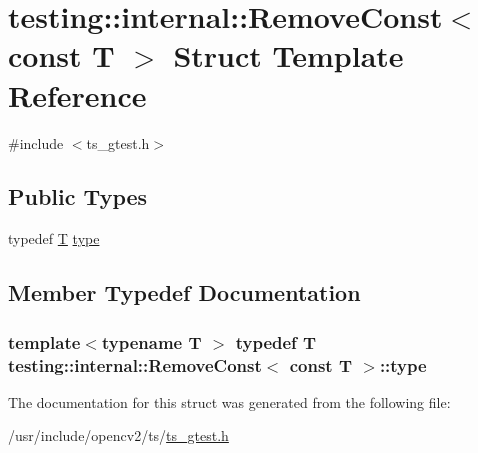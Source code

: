 \hypertarget{structtesting_1_1internal_1_1RemoveConst_3_01const_01T_01_4}{\section{testing\-:\-:internal\-:\-:Remove\-Const$<$ const T $>$ Struct Template Reference}
\label{structtesting_1_1internal_1_1RemoveConst_3_01const_01T_01_4}
}


{\ttfamily \#include $<$ts\-\_\-gtest.\-h$>$}

\subsection*{Public Types}
\begin{DoxyCompactItemize}
\item 
typedef \hyperlink{calib3d_8hpp_a3efb9551a871ddd0463079a808916717}{T} \hyperlink{structtesting_1_1internal_1_1RemoveConst_3_01const_01T_01_4_ac88c6824d228ab05091e5a4f1c1a95fc}{type}
\end{DoxyCompactItemize}


\subsection{Member Typedef Documentation}
\hypertarget{structtesting_1_1internal_1_1RemoveConst_3_01const_01T_01_4_ac88c6824d228ab05091e5a4f1c1a95fc}{
\subsubsection[{type}]{\setlength{\rightskip}{0pt plus 5cm}template$<$typename T $>$ typedef {\bf T} {\bf testing\-::internal\-::\-Remove\-Const}$<$ const {\bf T} $>$\-::{\bf type}}}\label{structtesting_1_1internal_1_1RemoveConst_3_01const_01T_01_4_ac88c6824d228ab05091e5a4f1c1a95fc}


The documentation for this struct was generated from the following file\-:\begin{DoxyCompactItemize}
\item 
/usr/include/opencv2/ts/\hyperlink{ts__gtest_8h}{ts\-\_\-gtest.\-h}\end{DoxyCompactItemize}
